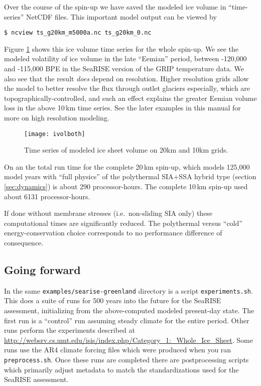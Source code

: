 Over the course of the spin-up we have saved the modeled ice volume in ``time-series'' NetCDF files.  This important model output can be viewed by
\begin{verbatim}
$ ncview ts_g20km_m5000a.nc ts_g20km_0.nc
\end{verbatim}
\noindent Figure \ref{fig:sr-spindone-ivolboth} shows this ice volume time series for the whole spin-up.  We see the modeled volatility of ice volume in the late ``Eemian'' period, between -120,000 and -115,000 BPE in the SeaRISE version of the GRIP temperature data.  We also see that the result \emph{does} depend on resolution.  Higher resolution grids allow the model to better resolve the flux through outlet glaciers especially, which are topographically-controlled, and such an effect explains the greater Eemian volume loss in the above 10\,km time series.  See the later examples in this manual for more on high resolution modeling.

\begin{figure}[ht]
\centering
\texttt{[image: ivolboth]}
\caption{Time series of modeled ice sheet volume on 20km and 10km grids.}
\label{fig:sr-spindone-ivolboth}
\end{figure}


On an the total run time for the complete 20\,km spin-up, which models 125,000 model years with ``full physics'' of the polythermal SIA+SSA hybrid type (section \ref{sec:dynamics}) is about 290 processor-hours.  The complete 10\,km spin-up used about 6131 processor-hours.

If done without membrane stresses (i.e.~non-sliding SIA only) these computational times are significantly reduced.  The polythermal versus ``cold'' energy-conservation choice corresponds to no performance difference of consequence.


\subsection{Going forward}  \label{subsect:forecastcaution}  In the same \verb|examples/searise-greenland| directory is a script \verb|experiments.sh|.  This does a suite of runs for 500 years into the future for the SeaRISE assessment, initializing from the above-computed modeled present-day state.  The first run is a ``control''  run assuming steady climate for the entire period.  Other runs perform the experiments described at \url{http://websrv.cs.umt.edu/isis/index.php/Category_1:_Whole_Ice_Sheet}.  Some runs use the AR4 climate forcing files which were produced when you ran \texttt{preprocess.sh}.  Once these runs are completed there are postprocessing scripts which primarily adjust metadata to match the standardizations used for the SeaRISE assessment.

